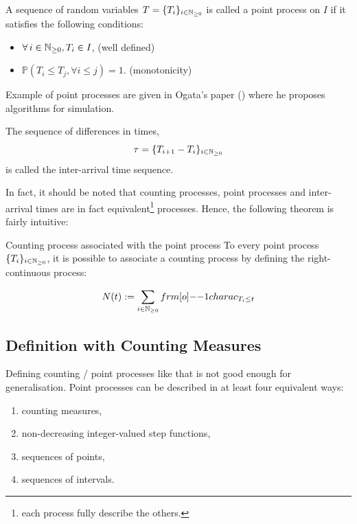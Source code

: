 \begin{definition}
\label{def:point}
A sequence of random variables $T = \{  T_i  \}_{ i \in \mathbb{N}_{\geq 0}} $ is called a point process on $I$ if it satisfies the following conditions:

\begin{itemize}
\item $\forall i \in \N, T_i \in I$, (well defined)
\item $\mathbb P ( T_i \leq T_j, \forall i \leq j) = 1$. (monotonicity)
\end{itemize}
\end{definition}

Example of point processes are given in Ogata's paper (\cite{Ogata}) where he proposes algorithms for simulation.


\begin{remarque}
\label{remarque:inter_arrival_times}
The sequence of differences in times, $$\tau = \{  T_{i+1} - T_i  \}_{ i \in \mathbb{N}_{\geq 0}} $$ is called the inter-arrival time sequence.
\end{remarque}


In fact, it should be noted that counting processes, point processes and inter-arrival times are in fact equivalent\footnote{each process fully describe the others.} processes. Hence, the following theorem is fairly intuitive:

\begin{theoreme}{Counting process associated with the point process}
To every point process $\{ T_i \}_{ i \in \mathbb{N}_{\geq 0}}$, it is possible to associate a counting process by defining the right-continuous process:

$$ N(t) := \sum_{ i \in \N} \11charac_{ T_i \leq t } $$ 

\end{theoreme}

\subsection{Definition with Counting Measures}
Defining counting / point processes like that is not good enough for generalisation. Point processes can be described in at least four equivalent ways:

\begin{enumerate}
\item counting measures,
\item non-decreasing integer-valued step functions,
\item sequences of points,
\item sequences of intervals.
\end{enumerate}


